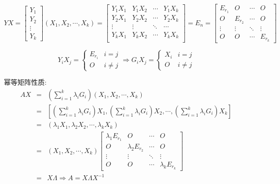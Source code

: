 \begin{anymark}[证明]
	$$YX = 
	\begin{bmatrix}
		Y_{1}\\
		Y_{2}\\
		\vdots\\
		Y_{k}
	\end{bmatrix}
	(X_{1},X_{2},\cdots,X_{k}) = 
	\begin{bmatrix}
		Y_{1}X_{1} & Y_{1}X_{2} & \cdots & Y_{1}X_{k}\\
		Y_{2}X_{1} & Y_{2}X_{2} & \cdots & Y_{2}X_{k}\\
		\vdots     & \vdots     & \ddots & \cdots\\
		Y_{k}X_{1} & Y_{k}X_{2} & \cdots & Y_{k}X_{k}\\
	\end{bmatrix} = E_{n} = 
	\begin{bmatrix}
		E_{r_{1}} & O         & \cdots & O\\
		O         & E_{r_{2}} & \cdots & O\\
		\vdots    & \vdots    & \ddots & \vdots\\
		O         & O         & \cdots & E_{r_{k}}
	\end{bmatrix}$$

	$$Y_{i}X_{j} = 
	\begin{cases}
	  E_{r_{i}} & i = j\\
	  O & i\neq j
	\end{cases}\Rightarrow
	G_{i}X_{j} = 
	\begin{cases}
	  X_{i} & i = j\\
	  O & i\neq j
	\end{cases}$$

	幂等矩阵性质:
	\begin{eqnarray*}
		AX  & = & \left( \sum\limits_{i = 1}^{k}\lambda_{i}G_{i}\right) (X_{1},X_{2},\cdots,X_{k}) \\
		    & = & \left[ \left(\sum\limits_{i = 1}^{k}\lambda_{i}G_{i}\right)X_{1}, \left(\sum\limits_{i = 1}^{k}\lambda_{i}G_{i}\right)X_{2}, 
		    \cdots, \left(\sum\limits_{i=1}^{k}\lambda_{i}G_{i}\right)X_{k} \right]\\
		    & = & (\lambda_{1}X_{1},\lambda_{2}X_{2},\cdots,\lambda_{k}X_{k})\\
		    & = & (X_{1},X_{2},\cdots,X_{k})
		    \begin{bmatrix}
		    	\lambda_{1}E_{r_{1}} & O                    & \cdots & O\\
		    	O                    & \lambda_{2}E_{r_{2}} & \cdots & O\\
		    	\vdots               & \vdots               & \ddots & \vdots\\
		    	O                    & O                    & \cdots & \lambda_{k}E_{r_{k}}					
		    \end{bmatrix}\\
		    & = & X\Lambda \Rightarrow A = X\Lambda X^{-1} 
	\end{eqnarray*}
	

\end{anymark}
